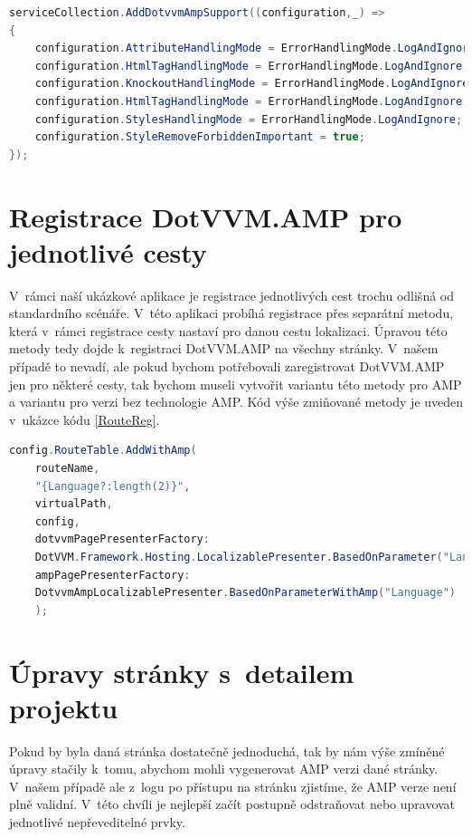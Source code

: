 \begin{lstlisting}[language=c#, caption=Ukázka možné AMP konfigurace,label=AmpConfig,captionpos=t]
serviceCollection.AddDotvvmAmpSupport((configuration,_) =>
{
	configuration.AttributeHandlingMode = ErrorHandlingMode.LogAndIgnore;
	configuration.HtmlTagHandlingMode = ErrorHandlingMode.LogAndIgnore;
	configuration.KnockoutHandlingMode = ErrorHandlingMode.LogAndIgnore;
	configuration.HtmlTagHandlingMode = ErrorHandlingMode.LogAndIgnore;
	configuration.StylesHandlingMode = ErrorHandlingMode.LogAndIgnore;
	configuration.StyleRemoveForbiddenImportant = true;
});
\end{lstlisting}

\section{Registrace DotVVM.AMP pro jednotlivé cesty}
V~rámci naší ukázkové aplikace je registrace jednotlivých cest trochu odlišná od standardního scénáře. V~této aplikaci probíhá registrace přes separátní metodu, která v~rámci registrace cesty nastaví pro danou cestu lokalizaci. Úpravou této metody tedy dojde k~registraci DotVVM.AMP na všechny stránky. V~našem případě to nevadí, ale pokud bychom potřebovali zaregistrovat DotVVM.AMP jen pro některé cesty, tak bychom museli vytvořit variantu této metody pro AMP a variantu pro verzi bez technologie AMP. Kód výše zmiňované metody je uveden v~ukázce kódu \ref{RouteReg}. 
\begin{lstlisting}[language=c#, caption=Registrace cesty s~DotVVM.AMP,label=RouteReg,captionpos=t]
config.RouteTable.AddWithAmp(
	routeName,
	"{Language?:length(2)}",
	virtualPath,
	config,
	dotvvmPagePresenterFactory:
	DotVVM.Framework.Hosting.LocalizablePresenter.BasedOnParameter("Language"),
	ampPagePresenterFactory:
	DotvvmAmpLocalizablePresenter.BasedOnParameterWithAmp("Language")
	);

\end{lstlisting}

\section{Úpravy stránky s~detailem projektu}
Pokud by byla daná stránka dostatečně jednoduchá, tak by nám výše zmíněné úpravy stačily k~tomu, abychom mohli vygenerovat AMP verzi dané stránky. V~našem případě ale z~logu po přístupu na stránku zjistíme, že AMP verze není plně validní. V~této chvíli je nejlepší začít postupně odstraňovat nebo upravovat jednotlivé nepřeveditelné prvky.

